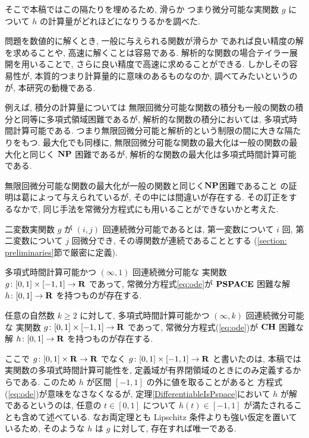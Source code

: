 そこで本稿ではこの隔たりを埋めるため, 滑らか
つまり微分可能な実関数 $g$ について $h$ の計算量がどれほどになりうるかを調べた.


問題を数値的に解くとき, 一般に与えられる関数が滑らか
であれば良い精度の解を求めることや, 高速に解くことは容易である.
解析的な関数の場合テイラー展開を用いることで, さらに良い精度で高速に求めることができる.
しかしその容易性が, 本質的つまり計算量的に意味のあるものなのか, 調べてみたいというのが,
本研究の動機である.

例えば, 積分の計算量については
無限回微分可能な関数の積分も一般の関数の積分と同等に多項式領域困難であるが,
解析的な関数の積分においては, 多項式時間計算可能である.
つまり無限回微分可能と解析的という制限の間に大きな隔たりをもつ.
最大化でも同様に, 無限回微分可能な関数の最大化は一般の関数の最大化と同じく
$\mathbf{NP}$ 困難であるが,
解析的な関数の最大化は多項式時間計算可能である.


無限回微分可能な関数の最大化が一般の関数と同じく$\mathbf{NP}$困難であること
の証明は葛によって与えられているが, その中には間違いが存在する.
その訂正をするなかで, 同じ手法を常微分方程式にも用いることができないかと考えた.

二変数実関数 $g$ が $(i, j)$ 回連続微分可能であるとは,
第一変数について $i$ 回, 第二変数について $j$ 回微分でき, 
その導関数が連続であることとする
(\ref{section: preliminaries}節で厳密に定義).

 \begin{theorem}
  \label{DifferentiableIsPspace}
  多項式時間計算可能かつ $(\infty, 1)$ 回連続微分可能な
  実関数 $g \colon [0,1] \times [-1,1] \to \mathbf R$ であって, 
  常微分方程式\eqref{eq:ode}が
  $\mathbf{PSPACE}$ 困難な解 $h \colon [0, 1] \to \mathbf R$ を持つものが存在する.
 \end{theorem}

 \begin{theorem}
  \label{KTimesIsCH}
  任意の自然数 $k \ge 2$ に対して, 
  多項式時間計算可能かつ $(\infty, k)$ 回連続微分可能な
  実関数 $g \colon [0,1] \times [-1,1] \to \mathbf R$ であって, 
  常微分方程式(\ref{eq:ode})が
  $\mathbf{CH}$ 困難な解 $h \colon [0, 1] \to \mathbf R$ を持つものが存在する.
 \end{theorem}

ここで $g \colon [0,1] \times \mathbf R \to \mathbf R$ でなく
$g \colon [0,1] \times [-1, 1] \to \mathbf R$ と書いたのは, 
本稿では実関数の多項式時間計算可能性を, 
定義域が有界閉領域のときにのみ定義するからである. 
このため $h$ が区間 $[-1, 1]$ の外に値を取ることがあると
方程式(\ref{eq:ode})が意味をなさなくなるが, 
定理\ref{DifferentiableIsPspace}において $h$ が解であるというのは, 
任意の $t \in [0, 1]$ について $h (t) \in [-1, 1]$ が満たされることも含めて述べている.
なお両定理とも Lipschitz 条件よりも強い仮定を置いているため, 
そのような $h$ は $g$ に対して, 存在すれば唯一である. 

